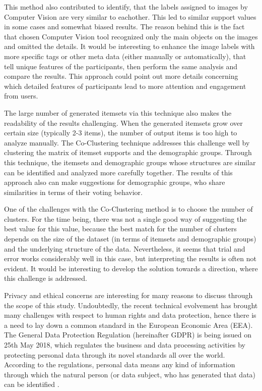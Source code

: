 This method also contributed to identify, that the labels assigned to images by Computer Vision are very similar to eachother. This led to similar support values in some cases and somewhat biased results. The reason behind this is the fact that chosen Computer Vision tool recognized only the main objects on the images and omitted the details. It would be interesting to enhance the image labels with more specific tags or other meta data (either manually or automatically), that tell unique features of the participants, then perform the same analysis and compare the results. This approach could point out more details concerning which detailed features of participants lead to more attention and engagement from users.

The large number of generated itemsets via this technique also makes the readability of the results challenging. When the generated itemsets grow over certain size (typically 2-3 items), the number of output items is too high to analyze manually. The Co-Clustering technique addresses this challenge well by clustering the matrix of itemset supports and the demographic groups. Through this technique, the itemsets and demographic groups whose structures are similar can be identified and analyzed more carefully together. The results of this approach also can make suggestions for demographic groups, who share similarities in terms of their voting behavior.

One of the challenges with the Co-Clustering method is to choose the number of clusters. For the time being, there was not a single good way of suggesting the best value for this value, because the best match for the number of clusters depends on the size of the dataset (in terms of itemsets and demographic groups) and the underlying structure of the data. Nevertheless, it seems that trial and error works considerably well in this case, but interpreting the results is often not evident. It would be interesting to develop the solution towards a direction, where this challenge is addressed.

Privacy and ethical concerns are interesting for many reasons to discuss through the scope of this study. Undoubtedly, the recent technical evolvement has brought many challenges with respect to human rights and data protection, hence there is a need to lay down a common standard in the European Economic Area (EEA). The General Data Protection Regulation (hereinafter GDPR) \cite{gdpr} is being issued on 25th May 2018, which regulates the business and data processing activities by protecting personal data through its novel standards all over the world. According to the regulations, personal data means any kind of information through which the natural person (or data subject, who has generated that data) can be identified \cite{gdpr}. 

